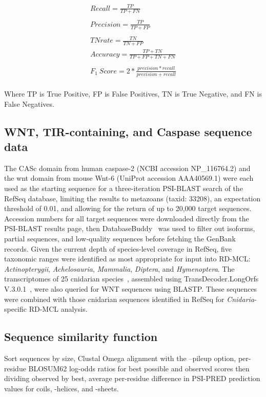 \documentclass[twocolumn]{bmcart}  %
\begin{document}
\begin{gather*}
    Recall = \frac{TP}{TP + FN}\\
    \\
    Precision = \frac{TP}{TP + FP}\\
    \\
    TN rate = \frac{TN}{TN + FP}
    \\
    Accuracy = \frac{TP + TN}{TP + FP + TN + FN}\\
    \\
    F_1\ Score = 2 * \frac{precision * recall}{precision + recall}\\
\end{gather*}

Where TP is True Positive, FP is False Positives, TN is True Negative, and FN is False Negatives.


\subsection{WNT, TIR-containing, and Caspase sequence data}\label{subsec:wnt,Tir-containing,AndCaspaseSequenceData}
The CASc domain from human caspase-2 (NCBI accession NP\_116764.2) and the wnt domain from mouse Wnt-6 (UniProt accession AAA40569.1) were each used as the starting sequence for a three-iteration PSI-BLAST search of the RefSeq database, limiting the results to metazoans (taxid: 33208), an expectation threshold of 0.01, and allowing for the return of up to 20,000 target sequences.
Accession numbers for all target sequences were downloaded directly from the PSI-BLAST results page, then DatabaseBuddy~\cite{Bond:2017bj} was used to filter out isoforms, partial sequences, and low-quality sequences before fetching the GenBank records.
Given the current depth of species-level coverage in RefSeq, five taxonomic ranges were identified as most appropriate for input into RD-MCL: \textit{Actinopterygii}, \textit{Achelosauria}, \textit{Mammalia}, \textit{Diptera}, and \textit{Hymenoptera}.
The transcriptomes of 25 cnidarian species~\cite{Zapata:2015cc}, assembled using TransDecoder.LongOrfs V.3.0.1~\cite{Haas:2013jq}, were also queried for WNT sequences using BLASTP\@.
These sequences were combined with those cnidarian sequences identified in RefSeq for \textit{Cnidaria}-specific RD-MCL analysis.


\subsection{Sequence similarity function}\label{subsec:seq-sim-func}
Sort sequences by size, Clustal Omega alignment with the --pileup option, per-residue BLOSUM62 log-odds ratios for best possible and observed scores then dividing observed by best, average per-residue difference in PSI-PRED prediction values for coils, \textalpha-helices, and \textbeta-sheets.
\end{document}
